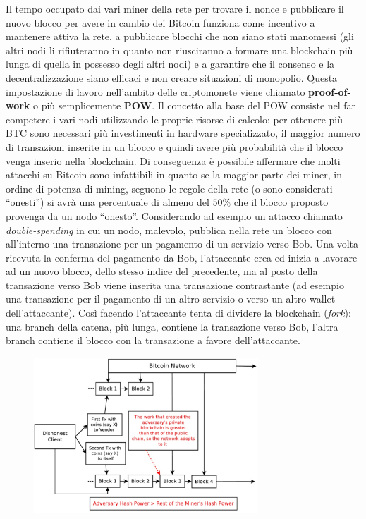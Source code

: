 \begin{enumerate}[1.]
Il tempo occupato dai vari miner della rete per trovare il nonce e pubblicare il nuovo blocco per avere in cambio dei Bitcoin funziona come incentivo a mantenere attiva la rete, a pubblicare blocchi che non siano stati manomessi (gli altri nodi li rifiuteranno in quanto non riusciranno a formare una blockchain più lunga di quella in possesso degli altri nodi) e a garantire che il consenso e la decentralizzazione siano efficaci e non creare situazioni di monopolio. Questa impostazione di lavoro nell'ambito delle criptomonete viene chiamato \textbf{proof-of-work} o più semplicemente \textbf{POW}. Il concetto alla base del POW consiste nel far competere i vari nodi utilizzando le proprie risorse di calcolo: per ottenere più BTC sono necessari più investimenti in hardware specializzato, il maggior numero di transazioni inserite in un blocco e quindi avere più probabilità che il blocco venga inserio nella blockchain. Di conseguenza è possibile affermare che molti attacchi su Bitcoin sono infattibili in quanto se la maggior parte dei miner, in ordine di potenza di mining, seguono le regole della rete (o sono considerati ``onesti'') si avrà una percentuale di almeno del $50\%$ che il blocco proposto provenga da un nodo ``onesto''.\newnline\newline
Considerando ad esempio un attacco chiamato \textit{double-spending} in cui un nodo, malevolo, pubblica nella rete un blocco con all'interno una transazione per un pagamento di un servizio verso Bob. Una volta ricevuta la conferma del pagamento da Bob, l'attaccante crea ed inizia a lavorare ad un nuovo blocco, dello stesso indice del precedente, ma al posto della transazione verso Bob viene inserita una transazione contrastante (ad esempio una transazione per il pagamento di un altro servizio o verso un altro wallet dell'attaccante). Così facendo l'attaccante tenta di dividere la blockchain (\textit{fork}): una branch della catena, più lunga, contiene la transazione verso Bob, l'altra branch contiene il blocco con la transazione a favore dell'attaccante.\newline
\begin{figure}
    \centering
    \includegraphics[width=0.75\textwidth]{images/forkingattack.png}

\end{figure}
\end{enumerate}
